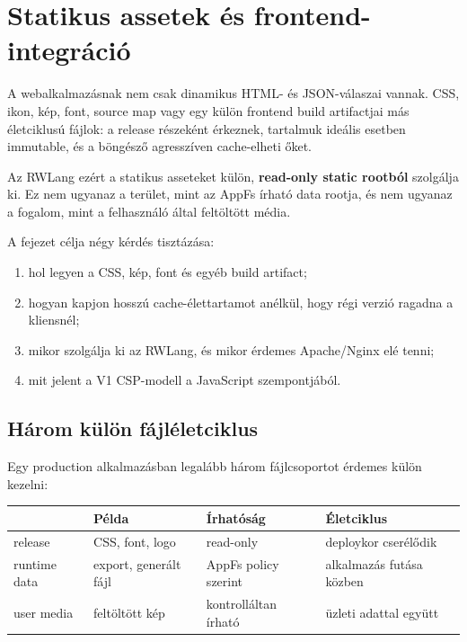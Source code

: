 \chapter{Statikus assetek és frontend-integráció}

A webalkalmazásnak nem csak dinamikus HTML- és JSON-válaszai vannak. CSS, ikon, kép, font, source map vagy egy külön frontend build artifactjai más életciklusú fájlok: a release részeként érkeznek, tartalmuk ideális esetben immutable, és a böngésző agresszíven cache-elheti őket.

Az RWLang ezért a statikus asseteket külön, \textbf{read-only static rootból} szolgálja ki. Ez nem ugyanaz a terület, mint az AppFs írható data rootja, és nem ugyanaz a fogalom, mint a felhasználó által feltöltött média.

A fejezet célja négy kérdés tisztázása:

\begin{enumerate}
  \item hol legyen a CSS, kép, font és egyéb build artifact;
  \item hogyan kapjon hosszú cache-élettartamot anélkül, hogy régi verzió ragadna a kliensnél;
  \item mikor szolgálja ki az RWLang, és mikor érdemes Apache/Nginx elé tenni;
  \item mit jelent a V1 CSP-modell a JavaScript szempontjából.
\end{enumerate}

\section{Három külön fájléletciklus}

Egy production alkalmazásban legalább három fájlcsoportot érdemes külön kezelni:

\begin{center}
\begin{tabularx}{\textwidth}{@{}lYYY@{}}
\toprule
 & Példa & Írhatóság & Életciklus \\
\midrule
release & CSS, font, logo & read-only & deploykor cserélődik \\
runtime data & export, generált fájl & AppFs policy szerint & alkalmazás futása közben \\
user media & feltöltött kép & kontrolláltan írható & üzleti adattal együtt \\
\bottomrule
\end{tabularx}
\end{center}

